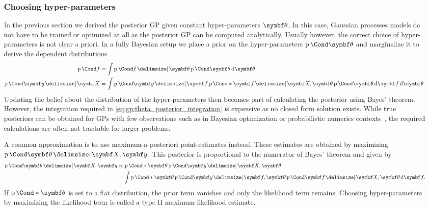 \subsubsection{Choosing hyper-parameters}
In the previous section we derived the posterior GP given constant hyper-parameters $\mat{\theta}$.
In this case, Gaussian processes models do not have to be trained or optimized at all as the posterior GP can be computed analytically.
Usually however, the correct choice of hyper-parameters is not clear a priori.
In a fully Bayesian setup we place a prior on the hyper-parameters $\Prob{\mat{\theta}}$ and marginalize it to derive the dependent distributions
\begin{align}
    \begin{split}
        \label{eq:gp:theta_posterior_integration}
        \Prob{f}
        & = \int \Prob{f \given \mat{\theta}} \Prob{\mat{\theta}} \diff \mat{\theta}                                                           \\
        \Prob{\mat{y} \given \mat{X}}
        & = \int \Prob{\mat{y} \given \mat{f}} \Prob*{\mat{f} \given \mat{X}, \mat{\theta}} \Prob{\mat{\theta}} \diff \mat{f} \diff \mat{\theta}.
    \end{split}
\end{align}
Updating the belief about the distribution of the hyper-parameters then becomes part of calculating the posterior using Bayes' theorem.
However, the integration required in \cref{eq:gp:theta_posterior_integration} is expensive as no closed form solution exists.
While true posteriors can be obtained for GPs with few observations such as in Bayesian optimization or probabilistic numerics contexts~\parencite{shahriari_taking_2016,oates_modern_2019}, the required calculations are often not tractable for larger problems.

A common approximation is to use maximum-a-posteriori point-estimates instead.
These estimates are obtained by maximizing $\Prob{\mat{\theta} \given \mat{X}, \mat{y}}$.
This posterior is proportional to the numerator of Bayes' theorem and given by
\begin{align}
    \begin{split}
        \Prob{\mat{\theta} \given \mat{X}, \mat{y}}
        &\propto \Prob*{\mat{\theta}} \Prob{\mat{y} \given \mat{X}, \mat{\theta}} \\
        &= \int \Prob*{\mat{\theta}}\Prob{\mat{y} \given \mat{f}, \mat{\theta}} \Prob{\mat{f} \given \mat{X}, \mat{\theta}} \diff \mat{f}.
    \end{split}
\end{align}
If $\Prob*{\mat{\theta}}$ is set to a flat distribution, the prior term vanishes and only the likelihood term remains.
Choosing hyper-parameters by maximizing the likelihood term is called a type II maximum likelihood estimate.

